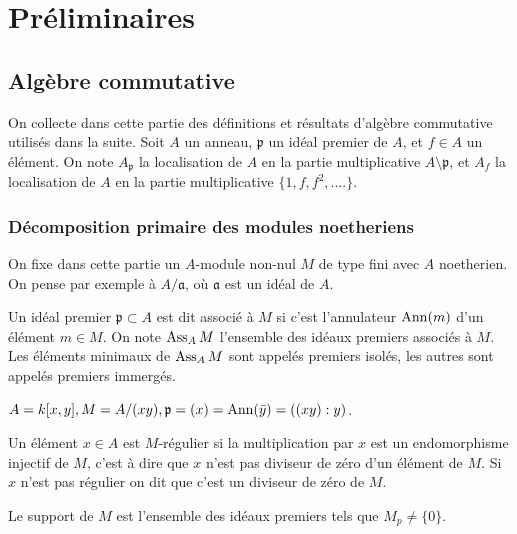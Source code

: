 \chapter{Préliminaires}

\section{Algèbre commutative}

On collecte dans cette partie des définitions et résultats d'algèbre commutative utilisés dans la suite. Soit $A$ un anneau, $\mathfrak{p}$ un idéal premier de $A$, et $f\in A$ un élément. On note $A_\mathfrak{p}$ la localisation de $A$ en la partie multiplicative $A\setminus \mathfrak{p}$, et $A_f$ la localisation de $A$ en la partie multiplicative $\lbrace 1, f, f^2, ....\rbrace$.

\subsection{Décomposition primaire des modules noetheriens}

On fixe dans cette partie un $A$-module non-nul $M$ de type fini avec $A$ noetherien. On pense par exemple à $A/\mathfrak{a}$, où $\mathfrak{a}$ est un idéal de $A$.

\begin{defn}
Un idéal premier $\mathfrak{p}\subset A$ est dit associé à $M$ si c'est l'annulateur $\operatorname{Ann}(m)$ d'un élément $m\in M$. On note $\operatorname{Ass}_AM$ l'ensemble des idéaux premiers associés à $M$. Les éléments minimaux de $\operatorname{Ass}_AM$ sont appelés premiers isolés, les autres sont appelés premiers immergés.
\end{defn}

\begin{ex}
$A=k[x,y], M=A/(xy),\mathfrak{p}=(x)=\operatorname{Ann}(\bar{y})=((xy):y)$.
\end{ex}

\begin{defn}
Un élément $x\in A$ est $M$-régulier si la multiplication par $x$ est un endomorphisme injectif de $M$, c'est à dire que $x$ n'est pas diviseur de zéro d'un élément de $M$. Si $x$ n'est pas régulier on dit que c'est un diviseur de zéro de $M$.
\end{defn}

\begin{defn}
Le support de $M$ est l'ensemble des idéaux premiers tels que $M_p\neq \lbrace 0\rbrace$.
\end{defn}

